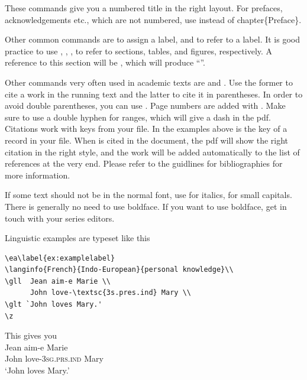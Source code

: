 These commands give you a numbered title in the right layout. For prefaces, acknowledgements etc., which are not numbered, use  instead of {{\bs}chapter\{Preface\}}.
 
Other common commands are 
to assign a label, and 
to refer to a label. It is good practice to use 
,
,
,
to refer to sections, tables, and figures, respectively. A reference to this section will be , which will produce ``''.

Other commands very often used in academic texts are  and . Use the former to cite a work in the running text and the latter to cite it in parentheses. In order to avoid double parentheses, you can use  . Page numbers are added with . Make sure to use a double hyphen for ranges, which will give a dash in the pdf. Citations work with keys from your \bibtex file. In the examples above  is the key of a record in your \bibtex file. When  is cited in the document, the pdf will show the right citation in the right style, and the work will be added automatically to the list of references at the very end. Please refer to the guidlines for bibliographies for more information.


If some text should not be in the normal font, use 
 for italics, 
 for small capitals. There is generally no need to use boldface. If you want to use boldface, get in touch with your series editors.

Linguistic examples are typeset like this

\begin{verbatim}
\ea\label{ex:examplelabel}
\langinfo{French}{Indo-European}{personal knowledge}\\
\gll  Jean aim-e Marie \\
      John love-\textsc{3s.pres.ind} Mary \\
\glt `John loves Mary.'    
\z
\end{verbatim}

This gives you
\ea\label{ex:examplelabel}
\\
\gll  Jean aim-e Marie \\
      John love-\textsc{3sg.prs.ind} Mary \\
\glt `John loves Mary.'    
\z

